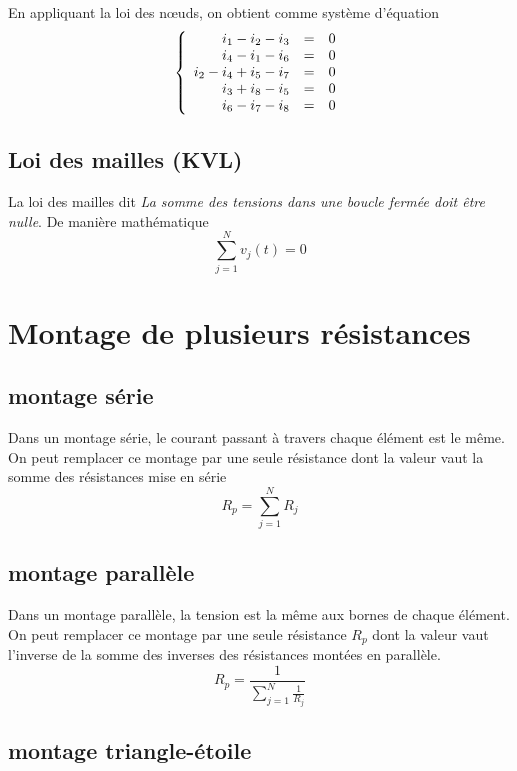 En appliquant la loi des nœuds, on obtient comme système d'équation
$$
\left\{
\begin{array} {r c l}
i_1 - i_2 -i_3 & = & 0\\
i_4-i_1-i_6&=&0\\
i_2 - i_4 + i_5 - i_7 &=& 0\\
i_3+i_8-i_5&=&0\\
i_6-i_7-i_8&=&0
\end{array}
\right.
$$
\subsection{Loi des mailles (KVL)}

La loi des mailles dit \emph{La somme des tensions dans une boucle fermée doit être nulle}. De manière mathématique
\begin{equation}
\sum_{j=1}^{N}{v_j(t)}=0  
\end{equation}

\section{Montage de plusieurs résistances}
\subsection{montage série}
Dans un montage série, le courant passant à travers chaque élément est le même. On peut remplacer ce montage par une seule résistance dont la valeur vaut la somme des résistances mise en série
\begin{equation}
R_p=\sum_{j=1}^{N}{R_j}
\end{equation}

\subsection{montage parallèle}
Dans un montage parallèle, la tension est la même aux bornes de chaque élément. On peut remplacer ce montage par une seule résistance $R_p$ dont la valeur vaut l'inverse de la somme des inverses des résistances montées en parallèle.
\begin{equation}
R_p=\frac{1}{\sum_{j=1}^{N}{\frac{1}{R_j}}}
\end{equation}

\subsection{montage triangle-étoile}

